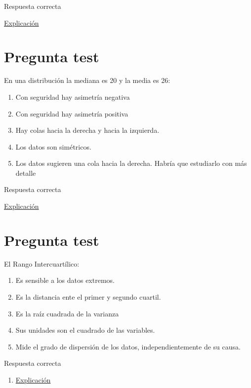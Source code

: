 \documentclass[
]{book}
\providecommand{\tightlist}{%
  \setlength{\itemsep}{0pt}\setlength{\parskip}{0pt}}
\begin{document}
Respuesta correcta

\href{https://1fjmanzano.github.io/bioestadistica/medidas-de-forma.html}{Explicación}

\hypertarget{pregunta-test-92}{%
\section{Pregunta test}\label{pregunta-test-92}}

En una distribución la mediana es 20 y la media es 26:

\begin{enumerate}
\def\labelenumi{\alph{enumi})}
\tightlist
\item
  Con seguridad hay asimetría negativa
\item
  Con seguridad hay asimetría positiva
\item
  Hay colas hacia la derecha y hacia la izquierda.
\item
  Los datos son simétricos.
\item
  Los datos sugieren una cola hacia la derecha. Habría que estudiarlo con más detalle
\end{enumerate}

Respuesta correcta

\href{https://1fjmanzano.github.io/bioestadistica/medidas-de-forma.html}{Explicación}

\hypertarget{pregunta-test-93}{%
\section{Pregunta test}\label{pregunta-test-93}}

El Rango Intercuartílico:

\begin{enumerate}
\def\labelenumi{\alph{enumi})}
\tightlist
\item
  Es sensible a los datos extremos.
\item
  Es la distancia ente el primer y segundo cuartil.
\item
  Es la raíz cuadrada de la varianza
\item
  Sus unidades son el cuadrado de las variables.
\item
  Mide el grado de dispersión de los datos, independientemente de su causa.
\end{enumerate}

Respuesta correcta

\begin{enumerate}
\def\labelenumi{\alph{enumi})}
\setcounter{enumi}{4}
\tightlist
\item
  \href{https://1fjmanzano.github.io/bioestadistica/medidas-de-posicio\%CC\%81n-dispersio\%CC\%81n-y-forma.html\#medidas-de-dispersio\%CC\%81n}{Explicación}
\end{enumerate}
\end{document}
